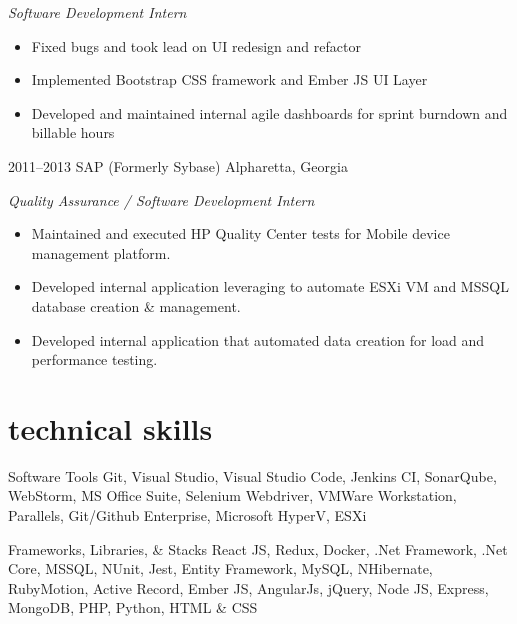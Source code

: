 \documentclass[]{friggeri-cv} %
\begin{document}
\begin{entrylist}
{  \emph{Software Development Intern}
  \begin{itemize}
    \item Fixed bugs and took lead on UI redesign and refactor
    \item Implemented Bootstrap CSS framework and Ember JS UI Layer
    \item Developed and maintained internal agile dashboards for sprint burndown and billable hours
  \end{itemize}
}
\entry
{2011--2013}
{SAP (Formerly Sybase)}
{Alpharetta, Georgia}
{\raggedright
  \emph{Quality Assurance / Software Development Intern}
  \begin{itemize}
    \item Maintained and executed HP Quality Center tests for Mobile device management platform.
    \item Developed internal application leveraging to automate ESXi VM and MSSQL database creation \& management.
    \item Developed internal application that automated data creation for load and performance testing. 
  \end{itemize}
}

\end{entrylist}

\pagebreak


\section{technical skills}
\begin{entrylist}
\entry
{}
{Software Tools}
{}
{Git, Visual Studio, Visual Studio Code, Jenkins CI, SonarQube, WebStorm, MS Office Suite, 
Selenium Webdriver, VMWare Workstation, Parallels, Git/Github Enterprise, Microsoft HyperV, ESXi}

\entry
{}
{Frameworks, Libraries, \& Stacks}
{}
{React JS, Redux, Docker, .Net Framework, .Net Core, MSSQL, NUnit, Jest, Entity Framework, MySQL, NHibernate, 
RubyMotion, Active Record, Ember JS, AngularJs, jQuery, Node JS, Express, MongoDB, PHP, Python, HTML \& CSS}
\end{entrylist}
\end{document}
